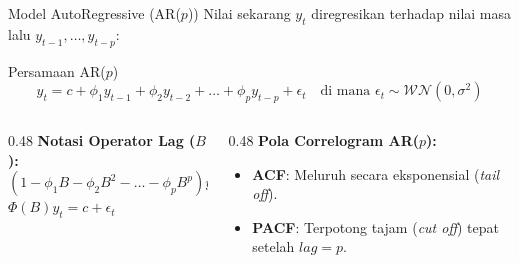 \documentclass[aspectratio=169, 10pt]{beamer}
\begin{document}
\begin{frame}{Model AutoRegressive (AR($p$))}
    Nilai sekarang $y_t$ diregresikan terhadap nilai masa lalu $y_{t-1}, \dots, y_{t-p}$:
    \begin{block}{Persamaan AR($p$)}
        \begin{equation}
            y_t = c + \phi_1 y_{t-1} + \phi_2 y_{t-2} + \dots + \phi_p y_{t-p} + \epsilon_t \quad \text{di mana } \epsilon_t \sim \mathcal{WN}(0, \sigma^2)
        \end{equation}
    \end{block}
    \begin{columns}[T]
        \begin{column}{0.48\textwidth}
            \textbf{Notasi Operator Lag ($B$):}
            \begin{equation}
                (1 - \phi_1 B - \phi_2 B^2 - \dots - \phi_p B^p)y_t = c + \epsilon_t
            \end{equation}
            $\Phi(B)y_t = c + \epsilon_t$
        \end{column}
        \begin{column}{0.48\textwidth}
            \textbf{Pola Correlogram AR($p$):}
            \begin{itemize}
                \item \textbf{ACF}: Meluruh secara eksponensial (\textit{tail off}).
                \item \textbf{PACF}: Terpotong tajam (\textit{cut off}) tepat setelah $lag = p$.
            \end{itemize}
        \end{column}
    \end{columns}
\end{frame}
\end{document}
